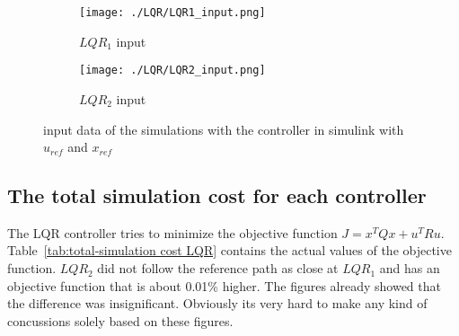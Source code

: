 \begin{figure}[H]
	\centering
	\begin{subfigure}[b]{0.45\textwidth}
		\texttt{[image: ./LQR/LQR1\_input.png]}
		\caption{$LQR_1$ input}
		\label{fig:LQR1 input}
	\end{subfigure}
	\begin{subfigure}[b]{0.45\textwidth}
		\texttt{[image: ./LQR/LQR2\_input.png]}
		\caption{$LQR_2$ input}
		\label{fig:LQR2 input}
	\end{subfigure}
	\caption{input data of the simulations with the controller in simulink with $u_{ref}$ and $x_{ref}$}
	\label{fig:simulink simulations LQR1 and LQR2 - inputs}
\end{figure}



\subsection{The total simulation cost for each controller}
The LQR controller tries to minimize the  objective function $J = x^TQx + u^TRu$. Table~\ref{tab:total-simulation cost LQR} contains the actual values of the objective function. $LQR_2$ did not follow the reference path as close at $LQR_1$ and has an objective function that is about 0.01\% higher. The figures already showed that the difference was insignificant. Obviously its very hard to make any kind of concussions solely based on these figures.

\begin{minipage}{\linewidth}
	\centering
	\label{tab:total-simulation cost LQR} 
	
\end{minipage}
